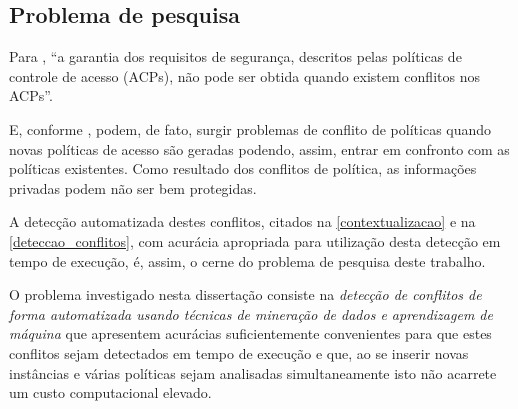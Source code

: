 \documentclass[
	12pt,				%
	openright,			%
	oneside,			%
	a4paper,			%
	english,			%
	french,				%
	spanish,			%
	brazil				%
	]{abntex2}
\begin{document}

\subsection{Problema de pesquisa}\label{problema}

Para , ``a garantia dos requisitos de segurança, descritos pelas políticas de controle de acesso (ACPs), não pode ser obtida quando existem conflitos nos ACPs''. 

E, conforme , podem, de fato, surgir problemas de conflito de políticas quando novas políticas de acesso são geradas podendo, assim, entrar em confronto com as políticas existentes. Como resultado dos conflitos de política, as informações privadas podem não ser bem protegidas.

A detecção automatizada destes conflitos, citados na \autoref{contextualizacao} e na \autoref{deteccao_conflitos}, com acurácia apropriada para utilização desta detecção em tempo de execução, é, assim, o cerne do problema de pesquisa deste trabalho. 

O problema investigado nesta dissertação consiste na \textit{detecção de conflitos de forma automatizada usando técnicas de mineração de dados e aprendizagem de máquina} que apresentem acurácias suficientemente convenientes para que estes conflitos sejam detectados em tempo de execução e que, ao se inserir novas instâncias e várias políticas sejam analisadas simultaneamente isto não acarrete um custo computacional elevado.
\end{document}
